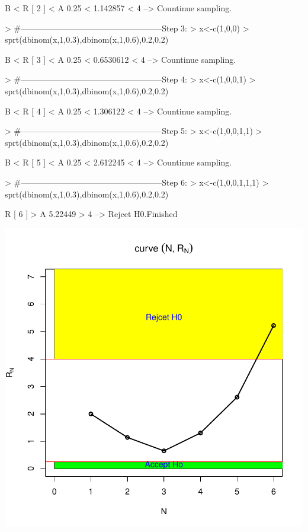 \documentclass{article}
\begin{document}
\begin{Schunk}
\begin{Soutput}
     B <  R [ 2 ] < A     
  0.25 < 1.142857 < 4    -->  Countinue sampling. 
\end{Soutput}
\begin{Sinput}
> #---------------------------------------------------Step 3:
> x<-c(1,0,0)
> sprt(dbinom(x,1,0.3),dbinom(x,1,0.6),0.2,0.2)
\end{Sinput}
\begin{Soutput}
     B <  R [ 3 ] < A     
  0.25 < 0.6530612 < 4    -->  Countinue sampling. 
\end{Soutput}
\begin{Sinput}
> #---------------------------------------------------Step 4:
> x<-c(1,0,0,1)
> sprt(dbinom(x,1,0.3),dbinom(x,1,0.6),0.2,0.2)
\end{Sinput}
\begin{Soutput}
     B <  R [ 4 ] < A     
  0.25 < 1.306122 < 4    -->  Countinue sampling. 
\end{Soutput}
\begin{Sinput}
> #---------------------------------------------------Step 5:
> x<-c(1,0,0,1,1)
> sprt(dbinom(x,1,0.3),dbinom(x,1,0.6),0.2,0.2)
\end{Sinput}
\begin{Soutput}
     B <  R [ 5 ] < A     
  0.25 < 2.612245 < 4    -->  Countinue sampling. 
\end{Soutput}
\begin{Sinput}
> #---------------------------------------------------Step 6:
> x<-c(1,0,0,1,1,1)
> sprt(dbinom(x,1,0.3),dbinom(x,1,0.6),0.2,0.2)
\end{Sinput}
\begin{Soutput}
 R [ 6 ] > A     
 5.22449 > 4       -->  Rejcet H0.Finished 
\end{Soutput}
\end{Schunk}
\includegraphics{SPRT-001}
\end{document}
